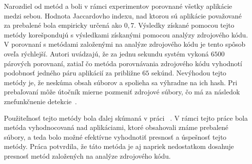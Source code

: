Narozdiel od metód  a  boli v rámci experimentov porovnané všetky aplikácie medzi sebou. Hodnota Jaccardovho indexu, nad ktorou sú aplikácie považované za prebalené bola empiricky určená ako $0,7$.
Výsledky získané pomocou tejto metódy korešpondujú s výsledkami získanými pomocou analýzy zdrojového kódu. V porovnaní s metódami založenými na analýze zdrojového kódu je tento spôsob oveľa rýchlejší. Autori uvádzajú, že za jednu sekundu systém vykoná $6500$ párových porovnaní, zatiaľ čo metóda porovnávania zdrojového kódu vyhodnotí podobnosť jedného páru aplikácií za približne $65$ sekúnd. 
Nevýhodou tejto metódy je, že neskúma obsah súborov a spolieha sa výhradne na ich hash. Pri prebaľovaní môže útočník mierne pozmeniť zdrojové súbory, čo má za následok znefunkčnenie detekcie~\cite{Zhauniarovich2014}. 

Použiteľnosť tejto metódy bola ďalej skúmaná v práci ~\cite{Gadyatskaya2016}. V rámci tejto práce bola metóda vyhodnocovaná nad aplikáciami, ktoré obsahovali známe prebalené súbory, a teda bolo možné efektívne vyhodnotiť presnosť a úspešnosť tejto metódy. Práca potvrdila, že táto metóda je aj napriek nedostatkom dosahuje presnosť metód založených na analýze zdrojového kódu.
